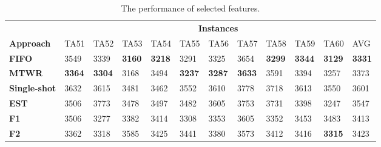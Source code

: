 \documentclass[runningheads]{llncs}
\begin{document}
\begin{table}
  \begin{center}
    \caption{The performance of selected features.}
    \label{tab4}

    \begin{tabular}{|l|l|l|l|l|l|l|l|l|l|l|l|} \hline
      & \multicolumn{11}{|c|}{\textbf{Instances}} \\ \cline{2-12}
      \textbf{Approach}   & TA51                           & TA52                           & TA53                           & TA54 & TA55                           & TA56                           & TA57                           & TA58 & TA59                           & TA60 & AVG  \\ \hline
      \textbf{FIFO}        & 3549                           & 3339                           & \textbf{3160}              & \textbf{3218} & 3291               & 3325                           & 3654                           & \textbf{3299} & \textbf{3344}                           & \textbf{3129} & \textbf{3331} \\
      \textbf{MTWR}        & \textbf{3364}           & \textbf{3304}              & 3168                           & 3494 & \textbf{3237}                           & \textbf{3287}               & \textbf{3633}              & 3591 & 3394                           & 3257 & 3373 \\
      \textbf{Single-shot} & 3632                           & 3615                           & 3481                           & 3462 & 3552                           & 3610                           & 3778                           & 3718 & 3613                           & 3550 & 3601 \\
      \textbf{EST}         & 3506                           & 3773                           & 3478                           & 3497 & 3482                           & 3605                           & 3753                           & 3731 & 3398                           & 3247 & 3547 \\ \hline
      \textbf{F1}          & 3506                           & 3277                           & 3382                           & 3414 & 3308                           & 3353                           & 3605                           & 3352 & 3453                           & 3483 & 3413 \\
      \textbf{F2}          & 3362                           & 3318                           & 3585                           & 3425 & 3441                           & 3380                           & 3573                           & 3412 & 3416                           & \textbf{3315} & 3423 \\

\end{tabular}
\end{center}
\end{table}
\end{document}

